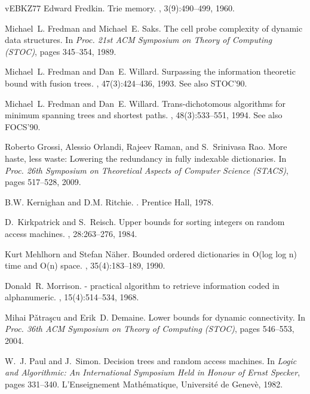 \documentclass[11pt,a4paper]{ctexart}
\begin{document}
\begin{thebibliography}{vEBKZ77}
Edward Fredkin.
\newblock Trie memory.
, 3(9):490--499, 1960.

Michael~L. Fredman and Michael~E. Saks.
\newblock The cell probe complexity of dynamic data structures.
\newblock In {\em Proc. 21st ACM Symposium on Theory of Computing (STOC)}, pages 345--354, 1989.

Michael~L. Fredman and Dan~E. Willard.
\newblock Surpassing the information theoretic bound with fusion trees.
, 47(3):424--436, 1993.
\newblock See also STOC'90.

Michael~L. Fredman and Dan~E. Willard.
\newblock Trans-dichotomous algorithms for minimum spanning trees and shortest paths.
, 48(3):533--551, 1994.
\newblock See also FOCS'90.

Roberto Grossi, Alessio Orlandi, Rajeev Raman, and S.~Srinivasa Rao.
\newblock More haste, less waste: Lowering the redundancy in fully indexable dictionaries.
\newblock In {\em Proc. 26th Symposium on Theoretical Aspects of Computer Science (STACS)}, pages 517--528, 2009.

B.W. Kernighan and D.M. Ritchie.
.
\newblock Prentice Hall, 1978.

D.~Kirkpatrick and S.~Reisch.
\newblock Upper bounds for sorting integers on random access machines.
, 28:263--276, 1984.

Kurt Mehlhorn and Stefan N{\"a}her.
\newblock Bounded ordered dictionaries in {O}(log log n) time and {O}(n) space.
, 35(4):183--189, 1990.

Donald~R. Morrison.
 - practical algorithm to retrieve information coded in alphanumeric.
, 15(4):514--534, 1968.

Mihai P{\v a}tra{\c s}cu and Erik~D. Demaine.
\newblock Lower bounds for dynamic connectivity.
\newblock In {\em Proc. 36th ACM Symposium on Theory of Computing (STOC)}, pages 546--553, 2004.

W.~J. Paul and J.~Simon.
\newblock Decision trees and random access machines.
\newblock In {\em Logic and Algorithmic: An International Symposium Held in Honour of Ernst Specker}, pages 331--340. L'Enseignement Math\'ematique, Universit\'e de Genev\`e, 1982.


\end{thebibliography}
\end{document}
